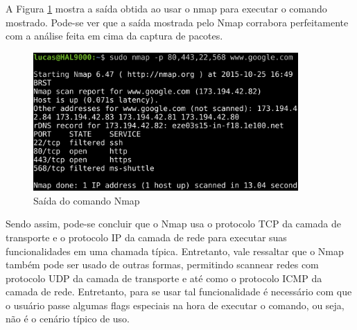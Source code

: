 A Figura \ref{fig:saida_nmap} mostra a saída obtida ao usar o nmap para executar o comando mostrado. Pode-se ver que a saída mostrada pelo Nmap corrabora
perfeitamente com a análise feita em cima da captura de pacotes.

\begin{figure}[h]
  \centering
  \includegraphics[width=0.9\textwidth]{figuras/saida_nmap.eps}
  \caption{Saída do comando Nmap}
  \label{fig:saida_nmap}
\end{figure}


Sendo assim, pode-se concluir que o Nmap usa o protocolo TCP da camada de transporte e o protocolo IP da camada de rede para executar suas funcionalidades
em uma chamada típica. Entretanto, vale ressaltar que o Nmap também pode ser usado de outras formas, permitindo scannear redes com protocolo UDP da camada de transporte
e até como o protocolo ICMP da camada de rede. Entretanto, para se usar tal funcionalidade é necessário com que o usuário passe algumas flags especiais na hora
de executar o comando, ou seja, não é o cenário típico de uso.


